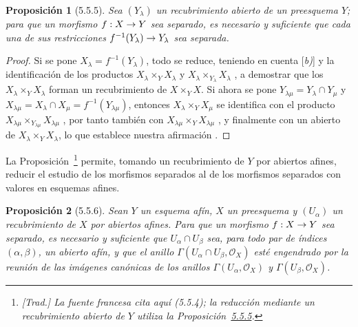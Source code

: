 \documentclass[oneside]{amsart}
\theoremstyle{ega-env-style}
\theoremstyle{ega-thm-env-style}
\newtheorem*{proposition}{Proposición}
\theoremstyle{ega-defn-env-style}
\renewcommand{\to}{\mathchoice{\longrightarrow}{\rightarrow}{\rightarrow}{\rightarrow}}
\newcommand{\oldpage}[2][]{{\marginnote{\normalfont{\textbf{#1}~|~#2}}}\ignorespaces}
\let\EGAOriginalLabel\label
\renewcommand{\label}[1]{\phantomsection\EGAOriginalLabel{#1}}
\begin{document}
\oldpage[I]{138}
\begin{proposition}[5.5.5]
\label{I.5.5.5-fr}
Sea $(Y_\lambda)$ un recubrimiento abierto de un preesquema $Y$;
para que un morfismo $f:X\to Y$ sea separado, es necesario y suficiente que cada una de sus restricciones $f^{-1}(Y_\lambda)\to Y_\lambda$ sea separada.
\end{proposition}

\begin{proof}
Si se pone $X_\lambda=f^{-1}(Y_\lambda)$, todo se reduce, teniendo en cuenta [\textit{b)}] y la identificación de los productos $X_\lambda\times_Y X_\lambda$ y $X_\lambda\times_{Y_\lambda}X_\lambda$ , a demostrar que los $X_\lambda\times_Y X_\lambda$ forman un recubrimiento de $X\times_Y X$.
Si ahora se pone $Y_{\lambda\mu}=Y_\lambda\cap Y_\mu$ y $X_{\lambda\mu}=X_\lambda\cap X_\mu=f^{-1}(Y_{\lambda\mu})$, entonces $X_\lambda\times_Y X_\mu$ se identifica con el producto $X_{\lambda\mu}\times_{Y_{\lambda\mu}}X_{\lambda\mu}$ , por tanto también con $X_{\lambda\mu}\times_Y X_{\lambda\mu}$ , y finalmente con un abierto de $X_\lambda\times_Y X_\lambda$, lo que establece nuestra afirmación .
\end{proof}

La Proposición~\footnote{\emph{[Trad.] La fuente francesa cita aquí (5.5.4); la reducción mediante un recubrimiento abierto de $Y$ utiliza la Proposición~\hyperref[I.5.5.5]{5.5.5}.}} permite, tomando un recubrimiento de $Y$ por abiertos afines, reducir el estudio de los morfismos separados al de los morfismos separados con valores en esquemas afines.

\begin{proposition}[5.5.6]
\label{I.5.5.6}
Sean $Y$ un esquema \emph{afín}, $X$ un preesquema y $(U_\alpha)$ un recubrimiento de $X$ por abiertos afines.
Para que un morfismo $f:X\to Y$ sea separado, es necesario y suficiente que $U_\alpha\cap U_\beta$ sea, para todo par de índices $(\alpha,\beta)$, un abierto afín, \emph{y} que el anillo $\Gamma(U_\alpha\cap U_\beta,\mathscr{O}_X)$ esté engendrado por la reunión de las imágenes canónicas de los anillos $\Gamma(U_\alpha,\mathscr{O}_X)$ y $\Gamma(U_\beta,\mathscr{O}_X)$.
\end{proposition}
\end{document}
